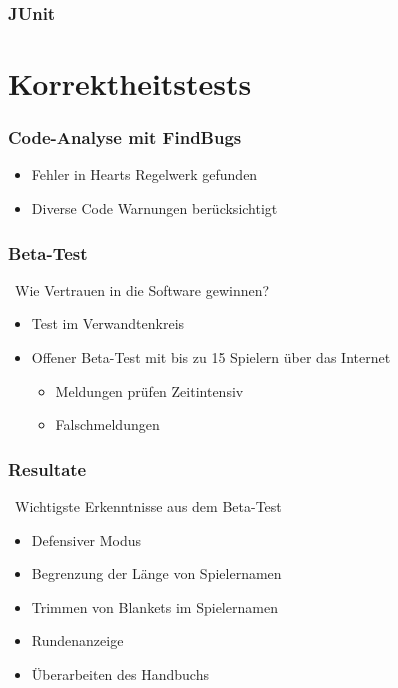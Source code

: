 \documentclass{beamer}
\begin{document}
\begin{frame}
  	\frametitle{JUnit}
\end{frame}

\section{Korrektheitstests}
\begin{frame}
  	\frametitle{Code-Analyse mit FindBugs}
  	\begin{itemize}
		\item Fehler in Hearts Regelwerk gefunden
		\item Diverse Code Warnungen berücksichtigt
	\end{itemize}
\end{frame}
\begin{frame}
  	\frametitle{Beta-Test}
	\ Wie Vertrauen in die Software gewinnen?
	\begin{itemize}
		\item Test im Verwandtenkreis
		\item Offener Beta-Test mit bis zu 15 Spielern über das Internet
		\begin{itemize}
			\item Meldungen prüfen Zeitintensiv
			\item Falschmeldungen
		\end{itemize}
	\end{itemize}
\end{frame}
\begin{frame}
  	\frametitle{Resultate}
	\ Wichtigste Erkenntnisse aus dem Beta-Test
	\begin{itemize}
		\item Defensiver Modus
		\item Begrenzung der Länge von Spielernamen
		\item Trimmen von Blankets im Spielernamen
		\item Rundenanzeige
		\item Überarbeiten des Handbuchs
	\end{itemize}
\end{frame}
\end{document}
